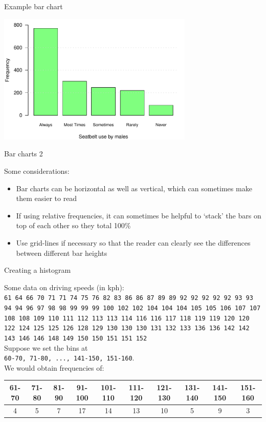 \documentclass[12pt,xcolor=dvipsnames,handout,mathserif,aspectratio=169]{beamer}
\begin{document}
\begin{frame}{ Example bar chart }

\begin{center}
\includegraphics[width=0.7\textwidth]{SeatbeltBarChartCompare.pdf}
\end{center}

\end{frame}


\begin{frame}{ Bar charts 2 }

Some considerations:
\begin{itemize}
\item Bar charts can be horizontal as well as vertical, which can sometimes make them easier to read
\pause
\item If using relative frequencies, it can sometimes be helpful to `stack' the bars on top of each other so they total 100\%
\pause
\item Use grid-lines if necessary so that the reader can clearly see the differences between different bar heights
\end{itemize}

\end{frame}

\begin{frame}{ Creating a histogram }

Some data on driving speeds (in kph):\\
\texttt{61 64 66 70 71 71 74 75 76 82 83 86 86 87 89 89 92 92 92 92 92 93 93 94 94 96 97 98 98 99 99 99 100 102 102 104 104 104 105 105 106 107 107 108 108 109 110 111 112 113 113 114 116 
116 117 118 119 119 120 120 122 124 125 125 126 128 129 130 130 130 131 132 133 136 136 142 142 143 146 146 148 149 150 150 151 151 152}\\
\pause
Suppose we set the bins at\\ \texttt{60-70, 71-80, ..., 141-150, 151-160}.\\
\vspace{0.2cm}
We would obtain frequencies of:
\tiny
\begin{center}
\begin{tabular}{cccccccccc}
\hline
61-70 & 71-80 & 81-90 & 91-100 & 101-110 & 111-120 & 121-130 & 131-140 & 141-150 & 151-160\\
\hline
4 & 5 & 7 & 17 & 14 & 13 & 10 &  5 &  9 &  3 \\
\hline
\end{tabular}
\end{center}

\end{frame}
\end{document}
